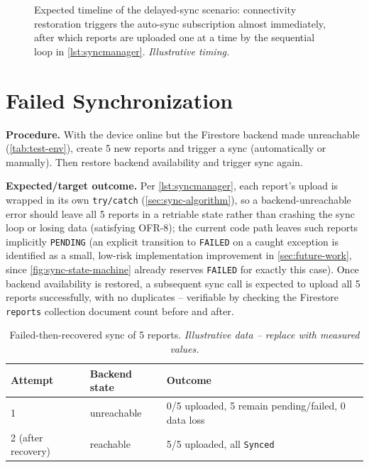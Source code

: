 \begin{figure}[htbp]
  \centering
  \caption{Expected timeline of the delayed-sync scenario: connectivity
  restoration triggers the auto-sync subscription almost immediately, after
  which reports are uploaded one at a time by the sequential loop in
  \cref{lst:syncmanager}. \emph{Illustrative timing.}}
  \label{fig:delayed-sync}
\end{figure}

\section{Failed Synchronization}
\label{sec:eval-failed-sync}

\textbf{Procedure.} With the device online but the Firestore backend made
unreachable (\cref{tab:test-env}), create 5 new reports and trigger a
sync (automatically or manually). Then restore backend availability and
trigger sync again.

\textbf{Expected/target outcome.} Per \cref{lst:syncmanager}, each
report's upload is wrapped in its own \texttt{try/catch}
(\cref{sec:sync-algorithm}), so a backend-unreachable error should leave
all 5 reports in a retriable state rather than crashing the sync loop or
losing data (satisfying OFR-8); the current code path leaves such reports
implicitly \texttt{PENDING} (an explicit transition to \texttt{FAILED} on
a caught exception is identified as a small, low-risk implementation
improvement in \cref{sec:future-work}, since \cref{fig:sync-state-machine}
already reserves \texttt{FAILED} for exactly this case). Once backend
availability is restored, a subsequent sync call is expected to upload all
5 reports successfully, with no duplicates -- verifiable by checking the
Firestore \texttt{reports} collection document count before and after.

\begin{table}[htbp]
\centering
\caption{Failed-then-recovered sync of 5 reports. \emph{Illustrative data
-- replace with measured values.}}
\label{tab:failed-sync-illustrative}
\begin{tabular}{@{}lll@{}}
\toprule
\textbf{Attempt} & \textbf{Backend state} & \textbf{Outcome} \\
\midrule
1 & unreachable & 0/5 uploaded, 5 remain pending/failed, 0 data loss \\
2 (after recovery) & reachable & 5/5 uploaded, all \texttt{Synced} \\
\bottomrule
\end{tabular}
\end{table}

